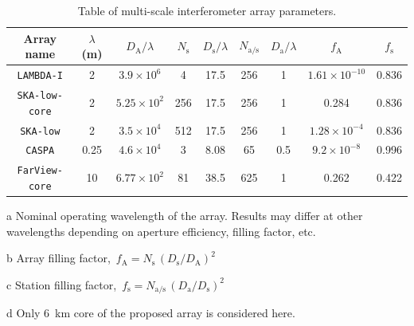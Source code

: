 \documentclass[
  journal=pasa,
  manuscript=article-type,
  year=2020,
  volume=37,
]{cup-journal}
\begin{document}
\begin{table}[htb!]
\normalsize
\begin{threeparttable}
\caption{Table of multi-scale interferometer array parameters.}
\label{tab:array_params}
\begin{tabular}{ccccccc|cc}
\toprule
\headrow Array name & $\lambda$ (m)\tnote{a} & $D_\textrm{A}/\lambda$ & $N_\textrm{s}$ & $D_\textrm{s}/\lambda$ & $N_\textrm{a/s}$ & $D_\textrm{a}/\lambda$ & $f_\textrm{A}$\tnote{b} & $f_\textrm{s}$\tnote{c} \\
\midrule
\texttt{LAMBDA-I} & 2 & $3.9\times 10^6$ & 4 & 17.5 & 256 & 1 &  $1.61\times 10^{-10}$ & 0.836 \\ 
\texttt{SKA-low-core} & 2 & $5.25\times 10^{2}$ & 256 & 17.5 & 256 & 1 & 0.284 & 0.836 \\ 
\texttt{SKA-low} & 2 & $3.5\times 10^4$ & 512 & 17.5 & 256 & 1 &  $1.28\times 10^{-4}$ & 0.836 \\ 
\texttt{CASPA} & 0.25 & $4.6\times 10^4$ & 3 & 8.08 & 65 & 0.5 &  $9.2\times 10^{-8}$ & 0.996 \\ 
\texttt{FarView-core}\tnote{d} & 10 & $6.77\times 10^2$ & 81 & 38.5 & 625 & 1 & 0.262 & 0.422 \\ 
\bottomrule
\end{tabular}
\begin{tablenotes}[hang]
\item[a]Nominal operating wavelength of the array. Results may differ at other wavelengths depending on aperture efficiency, filling factor, etc. 
\item[b]Array filling factor, $\,f_\textrm{A}=N_\textrm{s}\,(D_\textrm{s}/D_\textrm{A})^2$
\item[c]Station filling factor, $\,f_\textrm{s}=N_\textrm{a/s}\,(D_\textrm{a}/D_\textrm{s})^2$
\item[d]Only 6~km core of the proposed array \citep{Polidan+2024} is considered here.
\end{tablenotes}
\end{threeparttable}
\end{table}
\end{document}
